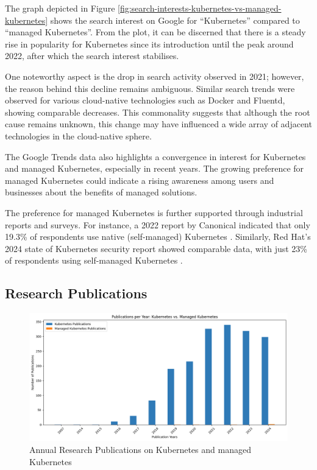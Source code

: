 The graph depicted in Figure \ref{fig:search-interests-kubernetes-vs-managed-kubernetes} shows the search interest on Google for “Kubernetes” compared to “managed Kubernetes”. From the plot, it can be discerned that there is a steady rise in popularity for Kubernetes since its introduction until the peak around 2022, after which the search interest stabilises.

One noteworthy aspect is the drop in search activity observed in 2021; however, the reason behind this decline remains ambiguous. Similar search trends were observed for various cloud-native technologies such as Docker and Fluentd, showing comparable decreases. This commonality suggests that although the root cause remains unknown, this change may have influenced a wide array of adjacent technologies in the cloud-native sphere.

The Google Trends data also highlights a convergence in interest for Kubernetes and managed Kubernetes, especially in recent years. The growing preference for managed Kubernetes could indicate a rising awareness among users and businesses about the benefits of managed solutions.

The preference for managed Kubernetes is further supported through industrial reports and surveys. For instance, a 2022 report by Canonical indicated that only 19.3\% of respondents use native (self-managed) Kubernetes \cite{}. Similarly, Red Hat's 2024 state of Kubernetes security report showed comparable data, with just 23\% of respondents using self-managed Kubernetes \cite{red_hat_inc_state_2024}.

\subsection{Research Publications}

\FloatBarrier

\begin{figure}
    \centering
    \includegraphics[width=1\linewidth]{resources/55ccf3419c03248ff5a2383d4ae63366.png}
    \caption{Annual Research Publications on Kubernetes and managed Kubernetes}
    \label{fig:research-publications-kubernetes-and-managed-kubernetes}
\end{figure}


